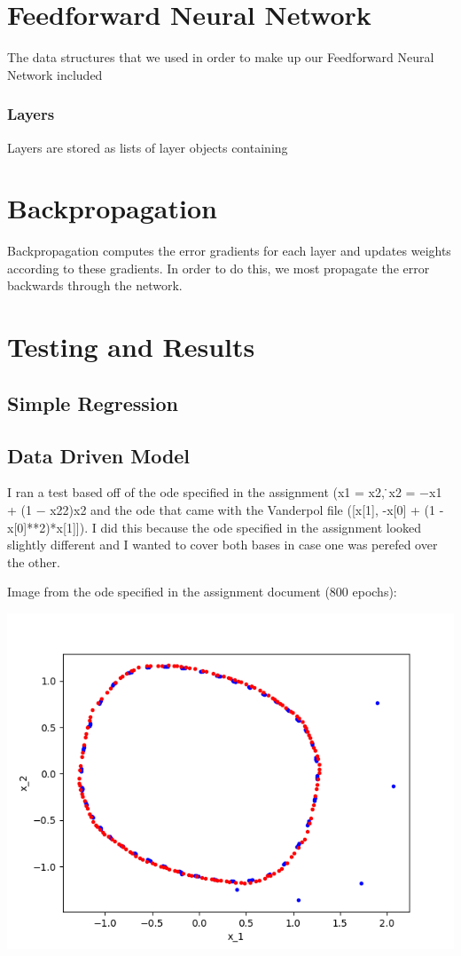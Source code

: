\documentclass{article}
\begin{document}
\section{Feedforward Neural Network} 

The data structures that we used in order to make up our Feedforward Neural Network included

\subsubsection{\textbf{Layers}}
 Layers are stored as lists of layer objects containing 

\section{Backpropagation}
Backpropagation computes the error gradients for each layer and updates weights according to these gradients. In order to do this, we most propagate the error backwards through the network.


\section{Testing and Results}

\subsection{Simple Regression}

\subsection{Data Driven Model}
I ran a test based off of the ode specified in the assignment (x1 = x2,  ̇x2 = −x1 + (1 − x22)x2 and the ode that came with the Vanderpol file ([x[1], -x[0] + (1 - x[0]**2)*x[1]]). I did this because the ode specified in the assignment looked slightly different and I wanted to cover both bases in case one was perefed over the other.

Image from the ode specified in the assignment document (800 epochs): 

\includegraphics[scale=1]{figs/800AssignmentODE.png}\\[0.5cm]
\end{document}
